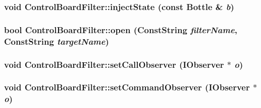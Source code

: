 \label{classyarp_1_1os_1_1_control_board_filter_a329bcebdddb5afbd7a5e7303e6941311}
\hypertarget{classyarp_1_1os_1_1_control_board_filter_a379021d871cc1d375d8ea2107b74911d}{
\subsubsection[{injectState}]{\setlength{\rightskip}{0pt plus 5cm}void ControlBoardFilter::injectState (const Bottle \& {\em b})}}
\label{classyarp_1_1os_1_1_control_board_filter_a379021d871cc1d375d8ea2107b74911d}
\hypertarget{classyarp_1_1os_1_1_control_board_filter_a27f3aa5419bce6ad6e421ddcb2e52131}{
\subsubsection[{open}]{\setlength{\rightskip}{0pt plus 5cm}bool ControlBoardFilter::open (ConstString {\em filterName}, \/  ConstString {\em targetName})}}
\label{classyarp_1_1os_1_1_control_board_filter_a27f3aa5419bce6ad6e421ddcb2e52131}
\hypertarget{classyarp_1_1os_1_1_control_board_filter_a72b5abaf68eb361c79d9de5071eb36b9}{
\subsubsection[{setCallObserver}]{\setlength{\rightskip}{0pt plus 5cm}void ControlBoardFilter::setCallObserver ({\bf IObserver} $\ast$ {\em o})}}
\label{classyarp_1_1os_1_1_control_board_filter_a72b5abaf68eb361c79d9de5071eb36b9}
\hypertarget{classyarp_1_1os_1_1_control_board_filter_a2500ae8300c6ca835f5b25133e1d04ed}{
\subsubsection[{setCommandObserver}]{\setlength{\rightskip}{0pt plus 5cm}void ControlBoardFilter::setCommandObserver ({\bf IObserver} $\ast$ {\em o})}}
